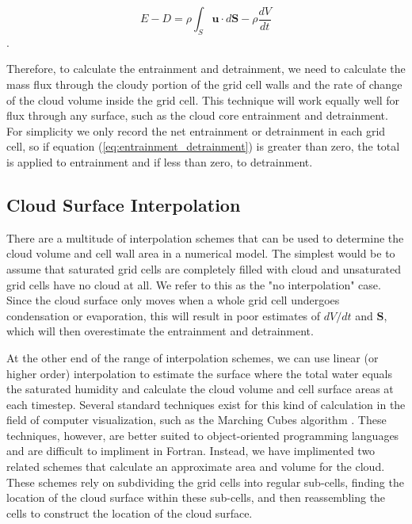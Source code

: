\documentclass[12pt]{article}
\begin{document}
\begin{equation}
\label{eq:entrainment_detrainment} 
E - D = \rho \int_S \mathbf{u} \cdot d\mathbf{S} - \rho \frac{dV}{dt}
\end{equation}.

Therefore, to calculate the entrainment and detrainment, we need to calculate 
the mass flux through the cloudy portion of the grid cell walls and the rate of 
change of the cloud volume inside the grid cell.  This technique will work 
equally well for flux through any surface, such as the cloud core entrainment 
and detrainment.  For simplicity we only record the net entrainment or 
detrainment in each grid cell, so if equation 
(\ref{eq:entrainment_detrainment}) is greater than zero, the total is applied 
to entrainment and if less than zero, to detrainment.


\subsection{Cloud Surface Interpolation}

There are a multitude of interpolation schemes that can be used to determine 
the cloud volume and cell wall area in a numerical model.  The simplest would 
be to assume that saturated grid cells are completely filled with cloud and 
unsaturated grid cells have no cloud at all.  We refer to this as the "no 
interpolation" case.  Since the cloud surface only moves when a whole grid cell 
undergoes condensation or evaporation, this will result in poor estimates of 
$dV/dt$ and $\mathbf{S}$, which will then overestimate the entrainment and 
detrainment.

At the other end of the range of interpolation schemes, we can use linear (or 
higher order) interpolation to estimate the surface where the total water 
equals the saturated humidity and calculate the cloud volume and cell surface 
areas at each timestep.  Several standard techniques exist for this kind of 
calculation in the field of computer visualization, such as the Marching 
Cubes algorithm \citep{Lorensen1987}.  These techniques, however, are better 
suited to object-oriented programming languages and are difficult to impliment 
in Fortran.  Instead, we have implimented two related schemes that calculate an 
approximate area and volume for the cloud.  These schemes rely on subdividing 
the grid cells into regular sub-cells, finding the location of the cloud 
surface within these sub-cells, and then reassembling the cells to construct 
the location of the cloud surface.
\end{document}
